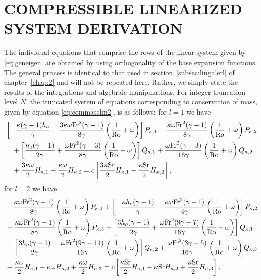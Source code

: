
\chapter[COMPRESSIBLE LINEARIZED SYSTEM DERIVATION]{COMPRESSIBLE LINEARIZED SYSTEM DERIVATION}
\label{App:2}

The individual equations that comprise the rows of the linear system given by \eqref{eq:geneigen} are obtained by using orthogonality of the base expansion functions. The general process is identical to that used in section~\ref{subsec:lingalerl} of chapter~\ref{chap:2} and will not be repeated here. Rather, we simply state the results of the integrations and algebraic manipulations. For integer truncation level $N$, the truncated system of equations corresponding to conservation of mass, given by equation \eqref{eq:commasslin2}, is as follows:
for $l=1$ we have
\begin{align}
&\left[- \frac{\kappa(\gamma-1)h_o}{\gamma} -\frac{3\kappa \omega \mathrm{Fr}^2 (\gamma-1)}{8 \gamma}\left( \frac{1}{\mathrm{Ro}}+\omega \right)\right] P_{\kappa,1} -\frac{\kappa \omega \mathrm{Fr}^2(\gamma-1)}{8\gamma}\left( \frac{1}{\mathrm{Ro}}+\omega \right)P_{\kappa,2} \notag \\
&\quad+ \left[\frac{h_o(\gamma-1)}{2\gamma} +\frac{\omega \mathrm{Fr}^2(\gamma-3)}{8\gamma}\left( \frac{1}{\mathrm{Ro}}+\omega \right)\right] Q_{\kappa,1} + \frac{\omega \mathrm{Fr}^2(\gamma-3)}{16\gamma}\left( \frac{1}{\mathrm{Ro}}+\omega \right) Q_{\kappa,2} \notag \\
&\quad+\frac{3\kappa \omega}{2}H_{\kappa,1}-\frac{\kappa \omega}{2}H_{\kappa,2}=c\left[\frac{3\kappa \mathrm{Sr}}{2}H_{\kappa,1}-\frac{\kappa \mathrm{Sr}}{2}H_{\kappa,2} \right],\label{eq:commassl0}
\end{align}
for $l=2$ we have
\begin{align}
&-\frac{\kappa \omega \mathrm{Fr}^2(\gamma-1)}{8\gamma}\left( \frac{1}{\mathrm{Ro}}+\omega \right)P_{\kappa,1} + \left[-\frac{\kappa h_o(\gamma-1)}{\gamma} -\frac{\kappa \omega \mathrm{Fr}^2(\gamma-1)}{4\gamma}\left( \frac{1}{\mathrm{Ro}}+\omega \right)\right] P_{\kappa,2} \notag \\
&\,-\frac{\kappa \omega \mathrm{Fr}^2(\gamma-1)}{8\gamma}\left( \frac{1}{\mathrm{Ro}}+\omega \right)P_{\kappa,3} + \left[\frac{3 h_o(\gamma-1)}{2\gamma} +\frac{\omega \mathrm{Fr}^2(9\gamma-7)}{16\gamma}\left( \frac{1}{\mathrm{Ro}}+\omega \right)\right] Q_{\kappa,1} \notag \\
&\,+\left[\frac{3 h_o(\gamma-1)}{2\gamma} +\frac{\omega \mathrm{Fr}^2(9\gamma-11)}{16\gamma}\left( \frac{1}{\mathrm{Ro}}+\omega \right)\right] Q_{\kappa,2} +\frac{\omega \mathrm{Fr}^2(3\gamma-5)}{16\gamma}\left( \frac{1}{\mathrm{Ro}}+\omega \right) Q_{\kappa,3} \notag \\
&\,+\frac{\kappa \omega}{2}H_{\kappa,1}-\kappa \omega H_{\kappa,2}+\frac{\kappa \omega}{2}H_{\kappa,3}=c\left[\frac{\kappa \mathrm{Sr}}{2} H_{\kappa,1}-\kappa \mathrm{Sr} H_{\kappa,2}+\frac{\kappa \mathrm{Sr}}{2} H_{\kappa,3} \right], \label{eq:commassl2}
\end{align}
